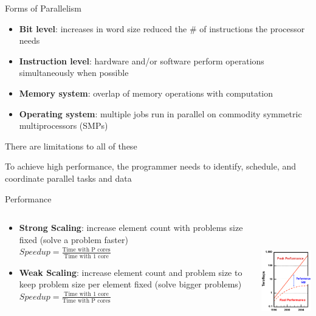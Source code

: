 \documentclass[xcolor=x11names,compress]{beamer}
\renewcommand{\(}{\begin{columns}}
\renewcommand{\)}{\end{columns}}
\newcommand{\<}[1]{\begin{column}{#1}}
\renewcommand{\>}{\end{column}}
\begin{document}
\begin{frame}{Forms of Parallelism}
\begin{itemize}
\item \textbf{Bit level}: increases in word size reduced the \# of instructions the processor needs
\item \textbf{Instruction level}: hardware and/or software perform operations simultaneously when possible
\item \textbf{Memory system}: overlap of memory operations with computation
\item \textbf{Operating system}: multiple jobs run in parallel on commodity symmetric multiprocessors (SMPs) 
\end{itemize}
There are limitations to all of these

\vspace*{1 em}
To achieve high performance, the programmer needs to identify, schedule, and coordinate parallel tasks and data

\end{frame}

\begin{frame}{Performance}

\begin{columns}
  \begin{column}{0.65\textwidth}
\begin{itemize}
\item \textbf{Strong Scaling}: increase element count with problems size fixed (solve a problem faster)\\
\vspace*{0.5 em}
$Speedup = \frac{\text{Time with P cores}}{\text{Time with 1 core}}$
\item \textbf{Weak Scaling}: increase element count and problem size to keep problem size per element fixed (solve bigger problems)\\
\vspace*{0.5 em}
$Speedup = \frac{\text{Time with 1 core}}{\text{Time with P cores}}$
\end{itemize}
  \end{column}
  \begin{column}{0.35\textwidth}
    \includegraphics[height=2in,clip]{PerformanceGap}
  \end{column}
\end{columns}

\end{frame}
\end{document}
